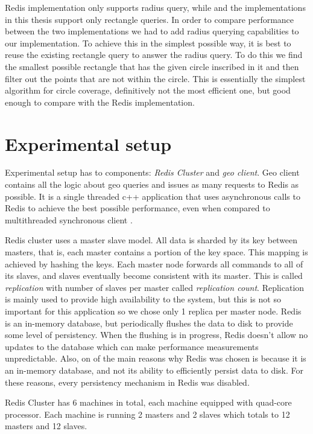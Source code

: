 \documentclass[times, utf8, diplomski]{fer}
\begin{document}
Redis implementation only supports radius query, while and the implementations in this thesis support only rectangle queries. In order to compare performance between the two implementations we had to add radius querying capabilities to our implementation. To achieve this in the simplest possible way, it is best to reuse the existing rectangle query to answer the radius query. To do this we find the smallest possible rectangle that has the given circle inscribed in it and then filter out the points that are not within the circle. This is essentially the simplest algorithm for circle coverage, definitively not the most efficient one, but good enough to compare with the Redis implementation.

\section {Experimental setup} \label{setup}
Experimental setup has to components: \emph{Redis Cluster} and \emph{geo client}. Geo client contains all the logic about geo queries and issues as many requests to Redis as possible. It is a single threaded c++ application that uses asynchronous calls to Redis to achieve the best possible performance, even when compared to multithreaded synchronous client \cite{clientperf}.

Redis cluster uses a master slave model. All data is sharded by its key between masters, that is, each master contains a portion of the key space. This mapping is achieved by hashing the keys. Each master node forwards all commands to all of its slaves, and slaves eventually become consistent with its master. This is called \emph{replication} with number of slaves per master called \emph{replication count}. Replication is mainly used to provide high availability to the system, but this is not so important for this application so we chose only 1 replica per master node.
Redis is an in-memory database, but periodically flushes the data to disk to provide some level of persistency. When the flushing is in progress, Redis doesn't allow no updates to the database which can make performance measurements unpredictable. Also, on of the main reasons why Redis was chosen is because it is an in-memory database, and not its ability to efficiently persist data to disk. For these reasons, every persistency mechanism in Redis was disabled.

Redis Cluster has 6 machines in total, each machine equipped with quad-core processor. Each machine is running 2 masters and 2 slaves which totals to 12 masters and 12 slaves. 
\end{document}
